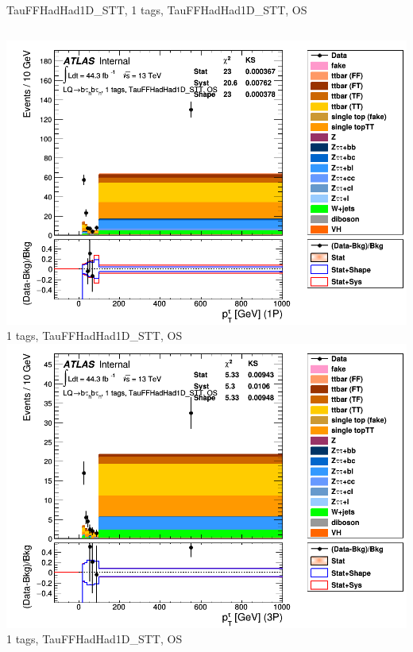 \begin{frame}{TauFFHadHad1D\_STT, 1 tags, TauFFHadHad1D\_STT, OS}
  \begin{columns}[c]
    \centering\includegraphics[width=\textwidth]{C_1tag2pjet_0ptv_OS_TauPt1P}\\
    1 tags, TauFFHadHad1D\_STT, OS
    \centering\includegraphics[width=\textwidth]{C_1tag2pjet_0ptv_OS_TauPt3P}\\
    1 tags, TauFFHadHad1D\_STT, OS
  \end{columns}
  \begin{columns}[c]

\end{columns}
\end{frame}
